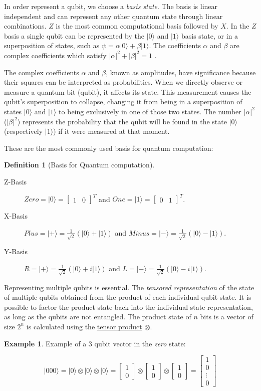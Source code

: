 \documentclass[11pt]{article}
\providecommand{\ket}[1]{|#1\rangle}
\newcommand{\myvec}[1]{\ensuremath{\begin{bmatrix}#1\end{bmatrix}}}
\theoremstyle{definition}
\newtheorem{exmp}{Example}[section]
\theoremstyle{definition}
\newtheorem{definition}{Definition}[section]
\begin{document}
In order represent a qubit, we choose a \emph{basis state}.
The basis is linear independent and can represent any other quantum state
through linear combinations.
\(Z\) is the most common computational basis followed by \(X\).
In the \(Z\) basis a single qubit can be represented by the \(\ket{0}\) and
\(\ket{1}\) basis state, or in a superposition of states, such as
\(\psi =  \alpha \ket{0} + \beta \ket{1}\).
The coefficients \(\alpha\) and \(\beta\) are complex coefficients which satisfy
\(|\alpha|^2 + |\beta|^2 = 1\) \cite{nielsen_quantum_2010}.

The complex coefficients \(\alpha\) and \(\beta\), known as amplitudes, have
significance because their squares can be interpreted as probabilities. 
When we directly observe or measure a quantum bit (qubit), it affects its
state.
This measurement causes the qubit's superposition to collapse, changing it
from being in a superposition of states \(\ket{0}\) and \(\ket{1}\) to being
exclusively in one of those two states. 
The number \(|\alpha|^2\) (\(|\beta|^2\)) represents the probability that
the qubit will be found in the state \(\ket{0}\) (respectively \(\ket{1}\)) if it were
measured at that moment.

These are the most commonly used basis for quantum computation:
\begin{definition}[Basis for Quantum computation]
\end{definition}
\begin{description}
\item[{Z-Basis}] \(Zero = \ket{0} = \myvec{1&0}^T\) and \(One = \ket{1} = \myvec{0&1}^T\).
\item[{X-Basis}] \(Plus =  \ket{+} = \frac{1}{\sqrt{2}}(\ket{0} + \ket{1})\) and \(Minus = \ket{-} = \frac{1}{\sqrt{2}}(\ket{0} - \ket{1})\).
\item[{Y-Basis}] \(R =  \ket{+} = \frac{1}{\sqrt{2}}(\ket{0} + i\ket{1})\) and \(L = \ket{-} = \frac{1}{\sqrt{2}}(\ket{0} - i\ket{1})\).
\end{description}

Representing multiple qubits is essential.
The \emph{tensored representation} of the state of multiple qubits obtained from the product
of each individual qubit state.
It is possible to factor the product state back into the individual state representation,
as long as the qubits are not entangled.
The product state of \(n\) bits is a vector of size \(2^n\) is calculated using
the \hyperref[sec:org358aa39]{tensor product} \(\otimes\).


\begin{exmp}
Example of a $3$ qubit vector in the \textit{zero} state:

\begin{equation}
\ket{000} = \ket{0} \otimes \ket{0} \otimes \ket{0} = \myvec{1\\0} \otimes \myvec{1\\0} \otimes \myvec{1\\0} = \myvec{1\\0\\\vdots\\0}
\end{equation}
\end{exmp}
\end{document}
